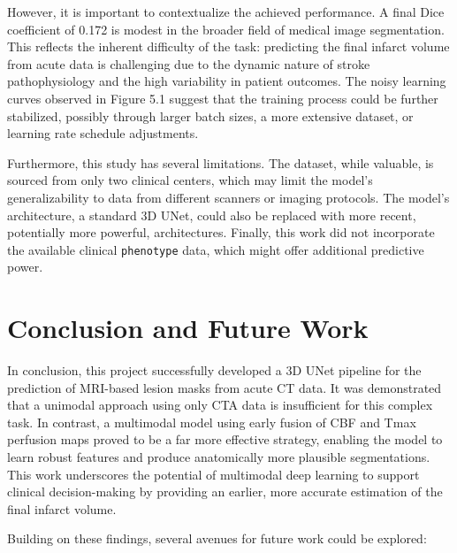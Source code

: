 However, it is important to contextualize the achieved performance. A final Dice coefficient of 0.172 is modest in the broader field of medical image segmentation. This reflects the inherent difficulty of the task: predicting the final infarct volume from acute data is challenging due to the dynamic nature of stroke pathophysiology and the high variability in patient outcomes. The noisy learning curves observed in Figure 5.1 suggest that the training process could be further stabilized, possibly through larger batch sizes, a more extensive dataset, or learning rate schedule adjustments.

Furthermore, this study has several limitations. The dataset, while valuable, is sourced from only two clinical centers, which may limit the model's generalizability to data from different scanners or imaging protocols. The model's architecture, a standard 3D UNet, could also be replaced with more recent, potentially more powerful, architectures. Finally, this work did not incorporate the available clinical \texttt{phenotype} data, which might offer additional predictive power.

\section{Conclusion and Future Work}
\label{sec:conclusion_future_work}

In conclusion, this project successfully developed a 3D UNet pipeline for the prediction of MRI-based lesion masks from acute CT data. It was demonstrated that a unimodal approach using only CTA data is insufficient for this complex task. In contrast, a multimodal model using early fusion of CBF and Tmax perfusion maps proved to be a far more effective strategy, enabling the model to learn robust features and produce anatomically more plausible segmentations. This work underscores the potential of multimodal deep learning to support clinical decision-making by providing an earlier, more accurate estimation of the final infarct volume.

Building on these findings, several avenues for future work could be explored:

